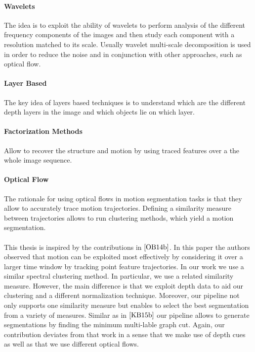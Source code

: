 \paragraph{Wavelets}
The idea is to exploit the ability of wavelets to perform analysis of the different frequency components of the images and then study each component with a resolution matched to its scale. Usually wavelet multi-scale decomposition is used in order to reduce the noise and in conjunction with other approaches, such as optical flow.

\paragraph{Layer Based} The key idea of layers based techniques is to understand which are the different depth layers in the image and which objects lie on which layer. 

\paragraph{Factorization Methods} Allow to recover the structure and motion by using traced features over a the whole image sequence.

\paragraph{Optical Flow}
The rationale for using optical flows in motion segmentation tasks is that they allow to accurately trace motion trajectories. Defining a similarity measure between trajectories allows to run clustering methods, which yield a motion segmentation. \\ \\
This thesis is inspired by the contributions in $\cite{OB14b}$. In this paper the authors observed that motion can be exploited most effectively by considering it over a larger time window by tracking point feature trajectories. In our work we use a similar spectral clustering method. In particular, we use a related similarity measure. However, the main difference is that we exploit depth data to aid our clustering and a different normalization technique. Moreover, our pipeline not only supports one similarity measure but enables to select the best segmentation from a variety of measures. Similar as in $\cite{KB15b}$ our pipeline allows to generate segmentations by finding the minimum multi-lable graph cut. Again, our contribution deviates from that work in a sense that we make use of depth cues as well as that we use different optical flows.

